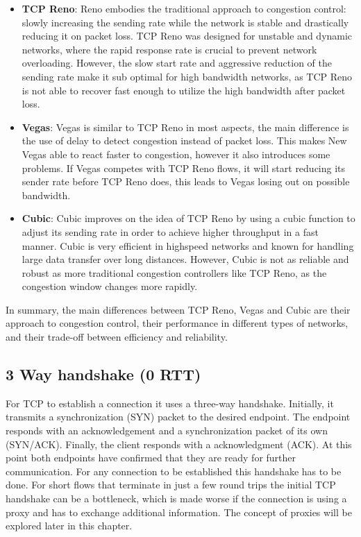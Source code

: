 \documentclass[a4paper,english, 12pt]{report}
\begin{document}
\begin{itemize}
  \item \textbf{TCP Reno}: Reno embodies the traditional approach to congestion control: slowly increasing the sending rate while the network is stable and drastically reducing it on packet loss. TCP Reno was designed for unstable and dynamic networks, where the rapid response rate is crucial to prevent network overloading. However, the slow start rate and aggressive reduction of the sending rate make it sub optimal for high bandwidth networks, as TCP Reno is not able to recover fast enough to utilize the high bandwidth after packet loss.
  \item \textbf{Vegas}: Vegas is similar to TCP Reno in most aspects, the main difference is the use of delay to detect congestion instead of packet loss. This makes New Vegas able to react faster to congestion, however it also introduces some problems. If Vegas competes with TCP Reno flows, it will start reducing its sender rate before TCP Reno does, this leads to Vegas losing out on possible bandwidth. 
  \item \textbf{Cubic}: Cubic improves on the idea of TCP Reno by using a cubic function to adjust its sending rate in order to achieve higher throughput in a fast manner. Cubic is very efficient in highspeed networks and known for handling large data transfer over long distances. However, Cubic is not as reliable and robust as more traditional congestion controllers like TCP Reno, as the congestion window changes more rapidly.
\end{itemize}

In summary, the main differences between TCP Reno, Vegas and Cubic are their approach to congestion control, their performance in different types of networks, and their trade-off between efficiency and reliability.

\subsection{3 Way handshake (0 RTT)}
For TCP to establish a connection it uses a three-way handshake. Initially, it transmits a synchronization (SYN) packet to the desired endpoint. The endpoint responds with an acknowledgement and a synchronization packet of its own (SYN/ACK). Finally, the client responds with a acknowledgment (ACK). At this point both endpoints have confirmed that they are ready for further communication. For any connection to be established this handshake has to be done. For short flows that terminate in just a few round trips the initial TCP handshake can be a bottleneck, which is made worse if the connection is using a proxy and has to exchange additional information. The concept of proxies will be explored later in this chapter.
\end{document}
